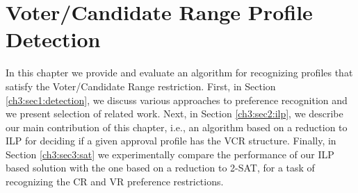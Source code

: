 
\chapter{Voter/Candidate Range Profile Detection}\label{ch:detection}

\ifpdf
    \graphicspath{{Chapter3/Figs/Raster/}{Chapter3/Figs/PDF/}{Chapter3/Figs/}}
\else
    \graphicspath{{Chapter3/Figs/Vector/}{Chapter3/Figs/}}
\fi


In this chapter we provide and evaluate an algorithm for recognizing profiles that satisfy the Voter/Candidate Range restriction.
First, in Section \ref{ch3:sec1:detection}, we discuss various approaches to preference recognition and we present selection of related work.
Next, in Section \ref{ch3:sec2:ilp}, we describe our main contribution of this chapter,
i.e., an algorithm based on a reduction to ILP for deciding if a given approval profile has the VCR structure.
Finally, in Section \ref{ch3:sec3:sat}
we experimentally compare the performance of our ILP based solution with the one based on a reduction to 2-SAT,
for a task of recognizing the CR and VR preference restrictions.


